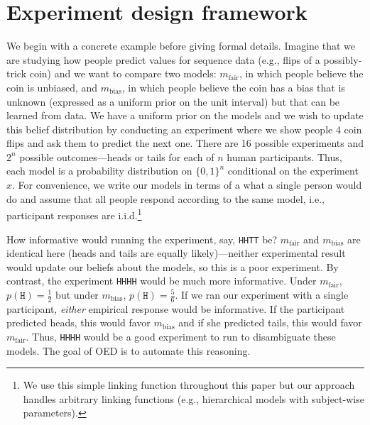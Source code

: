 \documentclass{article}
\begin{document}
\section{Experiment design framework}
\label{s:bayes}
We begin with a concrete example before giving formal details.
Imagine that we are studying how people predict values for sequence data (e.g., flips of a possibly-trick coin) and we want to compare two models: $m_{\text{fair}}$, in which people believe the coin is unbiased, and $m_{\text{bias}}$, in which people believe the coin has a bias that is unknown (expressed as a uniform prior on the unit interval) but that can be learned from data.
We have a uniform prior on the models and we wish to update this belief distribution by conducting an experiment where we show people 4 coin flips and ask them to predict the next one.
There are 16 possible experiments and $2^n$ possible outcomes---heads or tails for each of $n$ human participants.
Thus, each model is a probability distribution on $\{0,1\}^n$ conditional on the experiment $x$.
For convenience, we write our models in terms of a what a single person would do and assume that all people respond according to the same model, i.e., participant responses are i.i.d.\footnote{We use this simple linking function throughout this paper but our approach handles arbitrary linking functions (e.g., hierarchical models with subject-wise parameters).}

How informative would running the experiment, say, \lstinline{HHTT} be?
$m_{\text{fair}}$ and $m_{\text{bias}}$ are identical here (heads and tails are equally likely)---neither experimental result would update our beliefs about the models, so this is a poor experiment.
By contrast, the experiment \lstinline{HHHH} would be much more informative.
Under $m_{\text{fair}}$, $p(\texttt{H}) = \frac{1}{2}$ but under $m_{\text{bias}}$, $p(\texttt{H}) = \frac{5}{6}$.
If we ran our experiment with a single participant, \emph{either} empirical response would be informative.
If the participant predicted heads, this would favor $m_{\text{bias}}$ and if she predicted tails, this would favor $m_{\text{fair}}$.
Thus, \lstinline{HHHH} would be a good experiment to run to disambiguate these models.
The goal of OED is to automate this reasoning.
\end{document}
